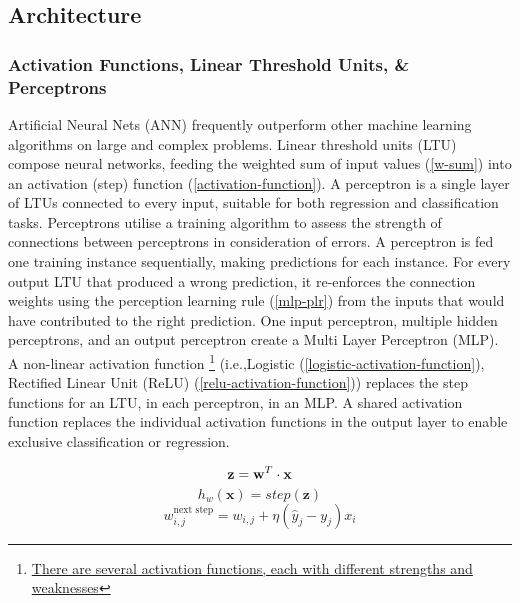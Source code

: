 \documentclass[12pt]{article}
\begin{document}
\subsection{Architecture} \label{nn-architecture}
\subsubsection{Activation Functions, Linear Threshold Units, \& Perceptrons}\label{mlp-math}
Artificial Neural Nets (ANN) frequently outperform other machine learning algorithms on large and complex problems.
Linear threshold units (LTU) compose neural networks, feeding the weighted sum of input values (\ref{w-sum}) into an activation (step) function (\ref{activation-function}).
A perceptron is a single layer of LTUs connected to every input, suitable for both regression and classification tasks.
Perceptrons utilise a training algorithm to assess the strength of connections between perceptrons in consideration of errors.
A perceptron is fed one training instance sequentially, making predictions for each instance.
For every output LTU that produced a wrong prediction, it re-enforces the connection weights using the perception learning rule (\ref{mlp-plr}) from the inputs that would have contributed to the right prediction.
One input perceptron, multiple hidden perceptrons, and an output perceptron create a Multi Layer Perceptron (MLP).
A non-linear activation function \footnote{\href{https://towardsdatascience.com/7-popular-activation-functions-you-should-know-in-deep-learning-and-how-to-use-them-with-keras-and-27b4d838dfe6}{There are several activation functions, each with different strengths and weaknesses}} (i.e.,Logistic (\ref{logistic-activation-function}), Rectified Linear Unit (ReLU) (\ref{relu-activation-function})) replaces the step functions for an LTU, in each perceptron, in an MLP.
A shared activation function replaces the individual activation functions in the output layer to enable exclusive classification or regression.
\begin{multicols}{3}
\noindent
    \begin{equation}
        \textbf{z} =\textbf{w}^{T} \cdot \textbf{x}\\
		\label{w-sum}
	\end{equation}
	\begin{equation}
		h_{w}(\textbf{x})=step(\textbf{z})
		\label{activation-function}
	\end{equation}
	\begin{equation}
		w_{i,j}^{\text{next step}} = w_{i,j} + \eta (\hat{y}_j - y_j)x_i 
		\label{mlp-plr}
    \end{equation}
\end{multicols}
\end{document}
